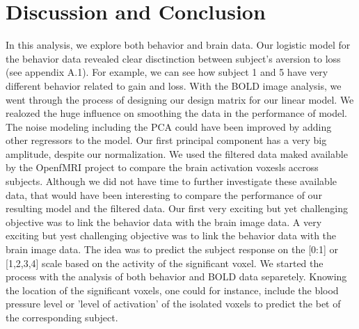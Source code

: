 \section{Discussion and Conclusion}
\noindent
\par In this analysis, we explore both behavior and brain data. 
Our logistic model for the behavior 
data revealed clear disctinction between subject's aversion to loss 
(see appendix A.1). For example, we can see how subject 1 and 5 have 
very different behavior related to gain and loss. 
With the BOLD image analysis, we went through the process of designing
our design matrix for our linear model.
We realozed the huge influence on smoothing the data in the performance of
model. The noise modeling including the PCA could have been improved by 
adding other regressors to the model. Our first principal component
has a very big amplitude, despite our normalization. We used the filtered
data maked available by the OpenfMRI project to compare the brain
activation voxesls accross subjects. Although we did not have time to
further investigate these available data, that would have been interesting
to compare the performance of our resulting model and the filtered data.
Our first very exciting but yet challenging objective was to link the behavior
data with the brain image data. 
A very exciting but yest challenging objective was to link the behavior
data with the brain image data. The idea was to predict the subject response
on the [0:1] or [1,2,3,4] scale based on the activity of the significant voxel.
We started the process with the analysis of both behavior and BOLD data separetely.
Knowing the location of the significant voxels, one could for instance, include the
blood pressure level or 'level of activation' of the isolated voxels to predict
the bet of the corresponding subject. 






